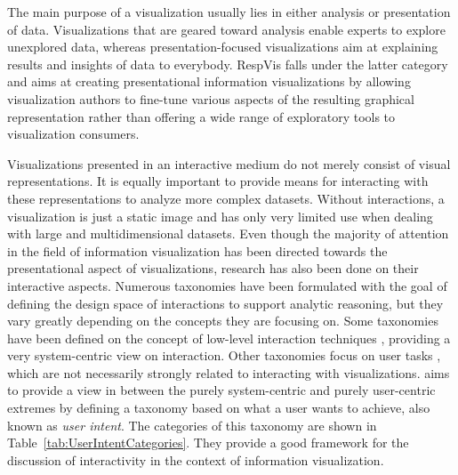 The main purpose of a visualization usually lies in either analysis or
presentation of data. Visualizations that are geared toward analysis
enable experts to explore unexplored data, whereas
presentation-focused visualizations aim at explaining results and
insights of data to everybody. RespVis falls under the latter category
and aims at creating presentational information visualizations by
allowing visualization authors to fine-tune various aspects of the
resulting graphical representation rather than offering a wide range
of exploratory tools to visualization consumers.   


Visualizations presented in an interactive medium do not merely
consist of visual representations. It is equally important to provide
means for interacting with these representations to analyze more
complex datasets. Without interactions, a visualization is just a
static image and has only very limited use when dealing with large and
multidimensional datasets. Even though the majority of attention in
the field of information visualization has been directed towards the
presentational aspect of visualizations, research has also been done
on their interactive aspects. Numerous taxonomies have been formulated
with the goal of defining the design space of interactions to support
analytic reasoning, but they vary greatly depending on the concepts
they are focusing on. Some taxonomies have been defined on the concept
of low-level interaction techniques
\parencite{TheEyesHaveIt,GrammarOfGraphics}, providing a very
system-centric view on interaction. Other taxonomies focus on user
tasks \parencite{LowLevelComponentsOfAnalyticActivity}, which are not
necessarily strongly related to interacting with visualizations.
\textcite{RoleOfInteractionInInformationVisualization} aims to provide
a view in between the purely system-centric and purely user-centric
extremes by defining a taxonomy based on what a user wants to achieve,
also known as \emph{user intent}. The categories of this taxonomy are
shown in Table~\ref{tab:UserIntentCategories}. They provide a good
framework for the discussion of interactivity in the context of
information visualization.


